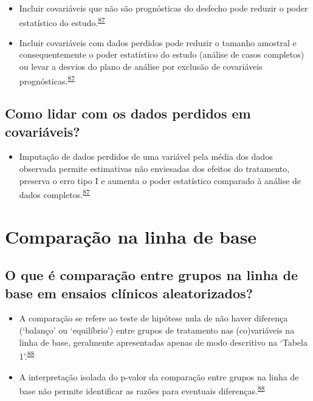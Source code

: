 \documentclass[
]{book}
\providecommand{\tightlist}{%
  \setlength{\itemsep}{0pt}\setlength{\parskip}{0pt}}
\begin{document}
\begin{itemize}
\item
  Incluir covariáveis que não são prognósticas do desfecho pode reduzir o poder estatístico do estudo.\textsuperscript{\protect\hyperlink{ref-Kahan2014}{87}}
\item
  Incluir covariáveis com dados perdidos pode reduzir o tamanho amostral e consequentemente o poder estatístico do estudo (análise de casos completos) ou levar a desvios do plano de análise por exclusão de covariáveis prognósticas.\textsuperscript{\protect\hyperlink{ref-Kahan2014}{87}}
\end{itemize}

\hypertarget{como-lidar-com-os-dados-perdidos-em-covariuxe1veis}{%
\subsection{Como lidar com os dados perdidos em covariáveis?}\label{como-lidar-com-os-dados-perdidos-em-covariuxe1veis}}

\begin{itemize}
\tightlist
\item
  Imputação de dados perdidos de uma variável pela média dos dados observada permite estimativas não enviesadas dos efeitos do tratamento, preserva o erro tipo I e aumenta o poder estatístico comparado à análise de dados completos.\textsuperscript{\protect\hyperlink{ref-Kahan2014}{87}}
\end{itemize}

\hypertarget{comparacao-linha-de-base}{%
\section{Comparação na linha de base}\label{comparacao-linha-de-base}}

\hypertarget{o-que-uxe9-comparauxe7uxe3o-entre-grupos-na-linha-de-base-em-ensaios-cluxednicos-aleatorizados}{%
\subsection{O que é comparação entre grupos na linha de base em ensaios clínicos aleatorizados?}\label{o-que-uxe9-comparauxe7uxe3o-entre-grupos-na-linha-de-base-em-ensaios-cluxednicos-aleatorizados}}

\begin{itemize}
\item
  A comparação se refere ao teste de hipótese nula de não haver diferença (`balanço' ou `equilíbrio') entre grupos de tratamento nas (co)variáveis na linha de base, geralmente apresentadas apenas de modo descritivo na `Tabela 1'.\textsuperscript{\protect\hyperlink{ref-Stang2018}{88}}
\item
  A interpretação isolada do p-valor da comparação entre grupos na linha de base não permite identificar as razões para eventuais diferenças.\textsuperscript{\protect\hyperlink{ref-Stang2018}{88}}
\end{itemize}
\end{document}
